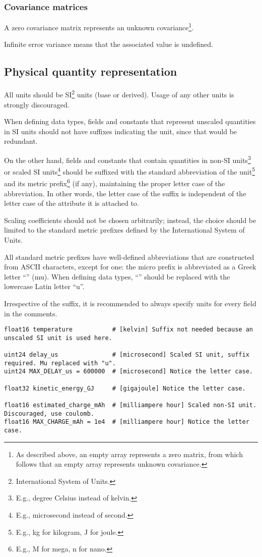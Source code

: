 \subsubsection{Covariance matrices}

A zero covariance matrix represents an unknown covariance\footnote{%
    As described above, an empty array represents a zero matrix,
    from which follows that an empty array represents unknown covariance.
}.

Infinite error variance means that the associated value is undefined.

\subsection{Physical quantity representation}

All units should be SI\footnote{International System of Units.} units (base or derived).
Usage of any other units is strongly discouraged.

When defining data types, fields and constants that represent unscaled quantities in SI units
should not have suffixes indicating the unit, since that would be redundant.

On the other hand, fields and constants that contain quantities in
non-SI units\footnote{E.g., degree Celsius instead of kelvin.}
or scaled SI units\footnote{E.g., microsecond instead of second.}
should be suffixed with the standard abbreviation of the unit\footnote{E.g., kg for kilogram, J for joule.}
and its metric prefix\footnote{E.g., M for mega, n for nano.}
(if any), maintaining the proper letter case of the abbreviation.
In other words, the letter case of the suffix is independent of the letter case of
the attribute it is attached to.

Scaling coefficients should not be chosen arbitrarily;
instead, the choice should be limited to the standard metric prefixes defined by the
International System of Units.

All standard metric prefixes have well-defined abbreviations that are constructed from ASCII characters,
except for one: the micro prefix is abbreviated as a Greek letter ``\textmu{}'' (mu).
When defining data types, ``\textmu{}'' should be replaced with the lowercase Latin letter ``u''.

Irrespective of the suffix, it is recommended to always specify units for every field in the comments.

\begin{remark}
\begin{verbatim}
float16 temperature           # [kelvin] Suffix not needed because an unscaled SI unit is used here.

uint24 delay_us               # [microsecond] Scaled SI unit, suffix required. Mu replaced with "u".
uint24 MAX_DELAY_us = 600000  # [microsecond] Notice the letter case.

float32 kinetic_energy_GJ     # [gigajoule] Notice the letter case.

float16 estimated_charge_mAh  # [milliampere hour] Scaled non-SI unit. Discouraged, use coulomb.
float16 MAX_CHARGE_mAh = 1e4  # [milliampere hour] Notice the letter case.
\end{verbatim}
\end{remark}
